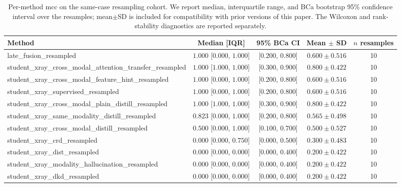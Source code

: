 \begin{table}[t]
\caption{Per-method mcc on the same-case resampling cohort. We report median, interquartile range, and BCa bootstrap 95\% confidence interval over the resamples; mean$\pm$SD is included for compatibility with prior versions of this paper. The Wilcoxon and rank-stability diagnostics are reported separately.}
\label{tab:mcc_resampling_stats}
\centering
\begin{tabular}{|l|c|c|c|c|}
\hline
Method & Median [IQR] & 95\% BCa CI & Mean $\pm$ SD & $n$ resamples \\ \hline
late_fusion_resampled & $1.000$ [$0.000$, $1.000$] & [$0.200$, $0.800$] & $0.600 \pm 0.516$ & 10 \\ \hline
student_xray_cross_modal_attention_transfer_resampled & $1.000$ [$1.000$, $1.000$] & [$0.300$, $0.900$] & $0.800 \pm 0.422$ & 10 \\ \hline
student_xray_cross_modal_feature_hint_resampled & $1.000$ [$0.000$, $1.000$] & [$0.200$, $0.800$] & $0.600 \pm 0.516$ & 10 \\ \hline
student_xray_supervised_resampled & $1.000$ [$0.000$, $1.000$] & [$0.200$, $0.800$] & $0.600 \pm 0.516$ & 10 \\ \hline
student_xray_cross_modal_plain_distill_resampled & $1.000$ [$1.000$, $1.000$] & [$0.300$, $0.900$] & $0.800 \pm 0.422$ & 10 \\ \hline
student_xray_same_modality_distill_resampled & $0.823$ [$0.000$, $1.000$] & [$0.200$, $0.800$] & $0.565 \pm 0.498$ & 10 \\ \hline
student_xray_cross_modal_distill_resampled & $0.500$ [$0.000$, $1.000$] & [$0.100$, $0.700$] & $0.500 \pm 0.527$ & 10 \\ \hline
student_xray_crd_resampled & $0.000$ [$0.000$, $0.750$] & [$0.000$, $0.500$] & $0.300 \pm 0.483$ & 10 \\ \hline
student_xray_dist_resampled & $0.000$ [$0.000$, $0.000$] & [$0.000$, $0.400$] & $0.200 \pm 0.422$ & 10 \\ \hline
student_xray_modality_hallucination_resampled & $0.000$ [$0.000$, $0.000$] & [$0.000$, $0.400$] & $0.200 \pm 0.422$ & 10 \\ \hline
student_xray_dkd_resampled & $0.000$ [$0.000$, $0.000$] & [$0.000$, $0.400$] & $0.200 \pm 0.422$ & 10 \\ \hline
\end{tabular}
\end{table}